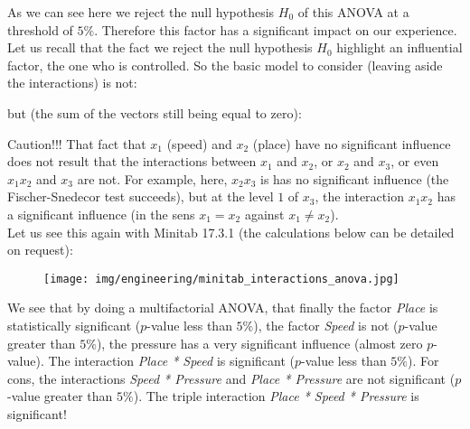 	As we can see here we reject the null hypothesis $H_0$ of this ANOVA at a threshold of $5\%$. Therefore this factor has a significant impact on our experience.\\
	
	Let us recall that the fact we reject the null hypothesis $H_0$ highlight an influential factor, the one who is controlled. So the basic model to consider (leaving aside the interactions) is not:
	
	but (the sum of the vectors still being equal to zero):
	
	Caution!!! That fact that $x_1$ (speed) and $x_2$ (place) have no significant influence does not result that the interactions between $x_1$ and $x_2$, or $x_2$ and $x_3$, or even $x_1x_2$ and $x_3$ are not. For example, here, $x_2x_3$ is has no significant influence (the Fischer-Snedecor test succeeds), but at the level $1$ of $x_3$, the interaction $x_1x_2$ has a significant influence (in the sens $x_1=x_2$ against $x_1\neq x_2$).\\

	Let us see this again with Minitab 17.3.1 (the calculations below can be detailed on request):
	\begin{figure}[H]
		\begin{center}
		\texttt{[image: img/engineering/minitab\_interactions\_anova.jpg]}
		\end{center}	
	\end{figure}
	We see that by doing a multifactorial ANOVA, that finally the factor \textit{Place} is statistically significant ($p$-value less than $5\%$), the factor \textit{Speed} is not ($p$-value greater than $5\%$), the pressure has a very significant influence (almost zero $p$-value). The interaction \textit{Place * Speed} is significant ($p$-value less than $5\%$). For cons, the interactions \textit{Speed * Pressure} and \textit{Place * Pressure} are not significant ($p$-value greater than $5\%$). The triple interaction \textit{Place * Speed * Pressure} is significant!\\
	

